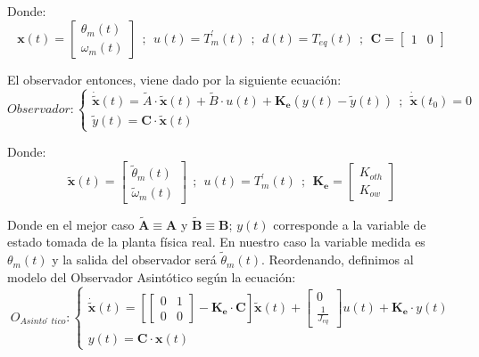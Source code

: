 \documentclass[10pt]{article}
\begin{document}
Donde:
\begin{equation}
	\textbf{x}(t)=
	\begin{bmatrix}
		\theta_m(t) \\ 
		\omega_m(t) 
	\end{bmatrix}
	\ \ ;\ \ u(t)=T_{m}^{'}(t)\ \ ;\ \ d(t)=T_{eq}(t)\ \ ;\ \ \textbf{C}=
	\begin{bmatrix}
		1 & 0
	\end{bmatrix}
\end{equation}

El observador entonces, viene dado por la siguiente ecuación:
\begin{equation}
	Observador :
	\begin{cases}
		\dot{\tilde{\textbf{x}}}(t)=\tilde{A}\cdot \tilde{\textbf{x}}(t)+\tilde{B}\cdot u(t)+\textbf{K}_\textbf{e}\left(y(t)-\tilde{y}(t)\right)\ \ ;\ \ \dot{\tilde{\textbf{x}}}(t_0)=0
		\\
		\tilde{y}(t)=\textbf{C}\cdot\tilde{\textbf{x}}(t)
	\end{cases}
\end{equation}

Donde:
\begin{equation}
	\tilde{\textbf{x}}(t)=
	\begin{bmatrix}
		\tilde{\theta}_m(t)\\
		\tilde{\omega}_m(t)
	\end{bmatrix}
	\ \ ;\ \ u(t)=T_{m}^{'}(t)\ \ ;\ \ \textbf{K}_\textbf{e}=
	\begin{bmatrix}
		K_{oth}\\
		K_{ow}
	\end{bmatrix}
\end{equation}

Donde en el mejor caso $\tilde{\textbf{A}} \equiv \textbf{A}$ y $\tilde{\textbf{B}} \equiv \textbf{B}$; $y(t)$ corresponde a la variable de estado tomada de la planta física real.
En nuestro caso la variable medida es $\theta_m(t)$ y la salida del observador será $\tilde{\theta}_m(t)$.
Reordenando, definimos al modelo del Observador Asintótico según la ecuación:
\begin{equation}
	O_{Asintótico}:
	\begin{cases}
		\dot{\tilde{\textbf{x}}}(t)=\left[
			\begin{bmatrix}
				0 & 1\\
				0 & 0
			\end{bmatrix}
			-\textbf{K}_{\textbf{e}}\cdot \textbf{C}
		\right]
		\tilde{\textbf{x}}(t)+
		\begin{bmatrix}
			0\\
			\frac{1}{J_{eq}}
		\end{bmatrix}
		u(t)+\textbf{K}_{\textbf{e}}\cdot y(t)
		\\
		y(t)=\textbf{C}\cdot \textbf{x}(t)
	\end{cases}
\end{equation}
\end{document}
